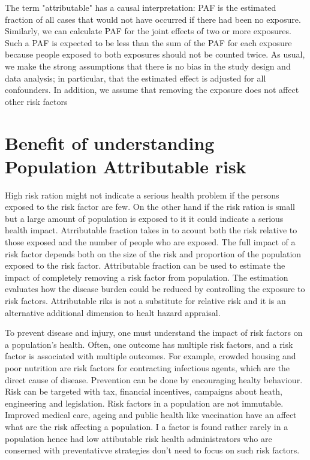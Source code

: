 The term "attributable" has a causal interpretation: PAF is the estimated fraction of all cases that would not have occurred if there had been no exposure. Similarly, we can calculate PAF for the joint effects of two or more exposures. Such a PAF is expected to be less than the sum of the PAF for each exposure because people exposed to both exposures should not be counted twice. As usual, we make the strong assumptions that there is no bias in the study design and data analysis; in particular, that the estimated effect is adjusted for all confounders. In addition, we assume that removing the exposure does not affect other risk factors\cite{mansournia2018population}



\section{Benefit of understanding Population Attributable risk}
High risk ration might not indicate a serious health problem if the persons exposed to the risk factor are few. On the other hand if the risk ration is small but a large amount of population is exposed to it it could indicate a serious health impact. Atrributable fraction takes in to acount both the risk relative to those exposed and the number of people who are exposed. \cite{Leung1981ComparisonsOC} The full impact of a risk factor depends both on the size of the risk and proportion of the population exposed to the risk factor. \cite{Drescher1991AttributableRE}  Attributable fraction can be used to estimate the impact of completely removing a risk factor from population. The estimation evaluates how the disease burden could be reduced by controlling the exposure to risk factors. \cite{DiMaso2020AttributableFF} Attributable riks is not a substitute for relative risk and it is an alternative additional dimension to healt hazard appraisal.\cite{Walter1976TheEA}

To prevent disease and injury, one must understand the impact of risk factors on a population's health. Often, one outcome has multiple risk factors, and a risk factor is associated with multiple outcomes. For example, crowded housing and poor nutrition are risk factors for contracting infectious agents, which are the direct cause of disease. 
Prevention can be done by encouraging healty behaviour. Risk can be targeted with tax, financial incentives, campaigns about heath, engineering and legislation. Risk factors in a population are not immutable. Improved medical care, ageing and public health like vaccination have an affect what are the risk affecting a population. 
\cite{WHO2009GlobalHealthRisks} I a factor is found rather rarely in a population hence had low attibutable risk health administrators who are conserned with preventativve strategies don't need to focus on such risk factors.\cite{Walter1976TheEA}

